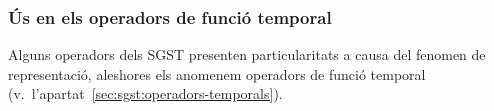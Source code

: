 







\subsubsection{Ús en els operadors de funció temporal}
\label{sec:sgst:repr-intervaltemporal}

Alguns operadors dels SGST presenten particularitats a causa del
fenomen de representació, aleshores els anomenem operadors de funció
temporal (v.\ l'apartat~\ref{sec:sgst:operadors-temporals}).

